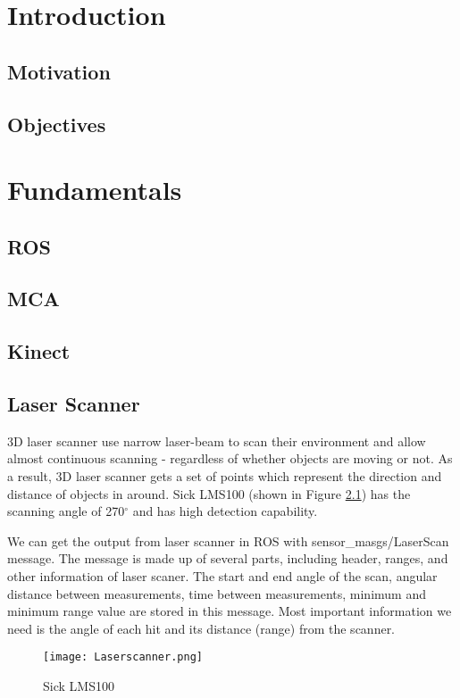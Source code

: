 \chapter{Introduction}
\section{Motivation}

\section{Objectives}

\chapter{Fundamentals}
\section{ROS}
\section{MCA}
\section{Kinect}
\section{Laser Scanner}
3D laser scanner use narrow laser-beam to scan their environment and allow almost continuous scanning - regardless of whether objects are moving or not. As a result, 3D laser scanner gets a set of points which represent the direction and distance of objects in around. Sick LMS100 (shown in Figure \ref{Laser}) has the scanning angle of  270$^\circ$ and has high detection capability.

We can get the output from laser scanner in ROS with sensor\_masgs/LaserScan message. The message is made up of several parts, including header, ranges, and other information of laser scaner. The start and end angle of the scan, angular distance between measurements, time between measurements, minimum and minimum range value are stored in this message. Most important information we need is the angle of each hit and its distance (range) from the scanner.

\begin{figure}[thpb]
      \centering
      \texttt{[image: Laserscanner.png]}
      \caption{Sick LMS100}
      \label{Laser}
   \end{figure}
